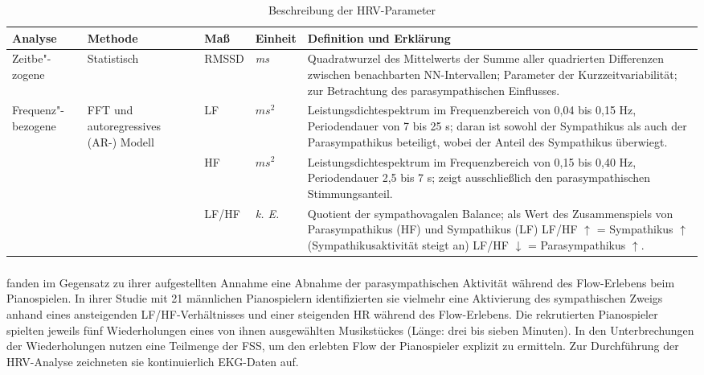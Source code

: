\begin{longtabu} to 
	\caption[Beschreibung der HRV-Parameter]{Beschreibung der HRV-Parameter} \\
	\toprule
	Analyse & Methode & Maß & Einheit & Definition und Erklärung \\
	\bottomrule
	\endhead
	\label{tab:beschreibung_der_hrv_parameter}
Zeitbe"-zogene & Statistisch & \acs{RMSSD} & \emph{ms} & Quadratwurzel des Mittelwerts der Summe aller quadrierten Differenzen zwischen benachbarten NN-Intervallen; Parameter der Kurzzeitvariabilität; zur Betrachtung des parasympathischen Einflusses. \\
\hline

Frequenz"-bezogene & \acs{FFT} und autoregressives (AR-) Modell & \acs{LF} & $ms^{2}$ & Leistungsdichtespektrum im Frequenzbereich von 0,04 bis 0,15 Hz, Periodendauer von 7 bis 25 s; daran ist sowohl der Sympathikus als auch der Parasympathikus beteiligt, wobei der Anteil des Sympathikus überwiegt. \\

& & \acs{HF} & $ms^{2}$ & Leistungsdichtespektrum im Frequenzbereich von 0,15 bis 0,40 Hz, Periodendauer 2,5 bis 7 s; zeigt ausschließlich den parasympathischen Stimmungsanteil. \\

& & LF/HF & \emph{k. E.} & Quotient der sympathovagalen Balance; als Wert des Zusammenspiels von Parasympathikus (HF) und Sympathikus (LF) LF/HF $\uparrow{}$ = Sympathikus $\uparrow{}$ (Sympathikusaktivität steigt an) LF/HF $\downarrow{}$ = Parasympathikus $\uparrow{}$. \\
\bottomrule

\end{longtabu}

\subsubsection{\citet{deManzano2010}} %
\label{ssub:demanzano2010}

\citet{deManzano2010} fanden im Gegensatz zu ihrer aufgestellten Annahme eine Abnahme der parasympathischen Aktivität während des Flow-Erlebens beim Pianospielen. In ihrer Studie mit 21 männlichen Pianospielern identifizierten sie vielmehr eine Aktivierung des sympathischen Zweigs anhand eines ansteigenden LF/HF-Verhältnisses und einer steigenden \ac{HR} während des Flow-Erlebens. Die rekrutierten Pianospieler spielten jeweils fünf Wiederholungen eines von ihnen ausgewählten Musikstückes (Länge: drei bis sieben Minuten). In den Unterbrechungen der Wiederholungen nutzen \citet{deManzano2010} eine Teilmenge der \ac{FSS}, um den erlebten Flow der Pianospieler explizit zu ermitteln. Zur Durchführung der \ac{HRV}-Analyse zeichneten sie kontinuierlich \ac{EKG}-Daten auf.

